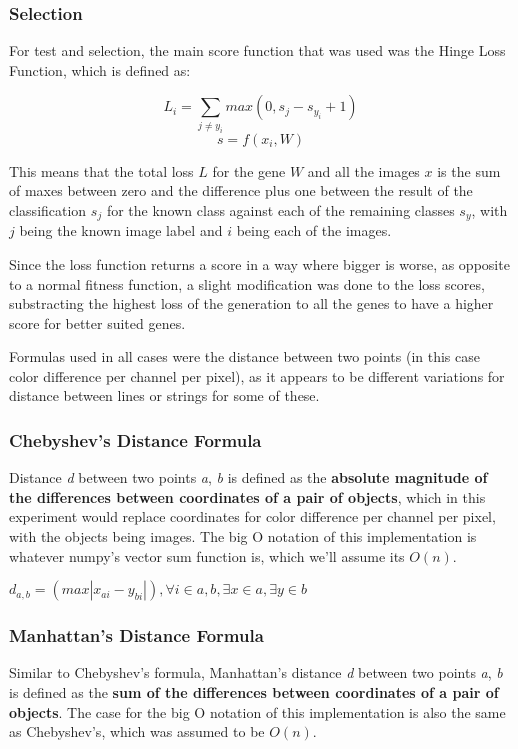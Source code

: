 \documentclass[conference,compsoc]{IEEEtran}
\begin{document}
\subsubsection{Selection}
For test and selection, the main score function that was used was the Hinge Loss Function, which is defined as:

\[L_{i} = \sum\limits_{j \ne y_i}max(0, s_j - s_{y_i} + 1)\]
\[ s = f(x_i, W) \]

This means that the total loss \(L\) for the gene \(W\) and all the images \(x\) is the sum of maxes between zero and the difference plus one between the result of the classification \(s_j\) for the known class against each of the remaining classes \(s_y\), with \(j\) being the known image label and \(i\) being each of the images.

Since the loss function returns a score in a way where bigger is worse, as opposite to a normal fitness function, a slight modification was done to the loss scores, substracting the highest loss of the generation to all the genes to have a higher score for better suited genes. 

Formulas used in all cases were the distance between two points (in this case color difference per channel per pixel), as it appears to be different variations for distance between lines or strings for some of these.
\subsubsection{Chebyshev's Distance Formula}
Distance \textit{d} between two points \textit{a}, \textit{b} is defined as the \textbf{absolute magnitude of the differences between coordinates of a pair of objects}, which in this experiment would replace coordinates for color difference per channel per pixel, with the objects being images. The big O notation of this implementation is whatever numpy's vector sum function is, which we'll assume its $O(n)$.

\vspace{3mm}
\(d_{a,b} =(max |x_{ai} - y_{bi}|),  \forall i \in a,b, \exists x \in a, \exists y \in b \)

\subsubsection{Manhattan's Distance Formula}
Similar to Chebyshev's formula, Manhattan's distance \textit{d} between two points \textit{a}, \textit{b} is defined as the \textbf{sum of the differences between coordinates of a pair of objects}. The case for the  big O notation of this implementation is also the same as Chebyshev's, which was assumed to be $O(n)$.
\end{document}
